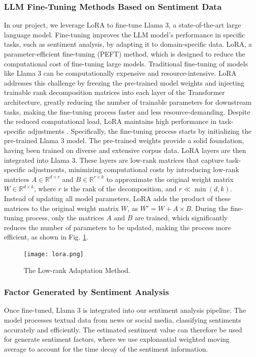 \documentclass[conference]{IEEEtran}
\begin{document}
\subsubsection{\textbf{LLM Fine-Tuning Methods Based on Sentiment Data}}
In our project, we leverage LoRA to fine-tune Llama 3, a state-of-the-art large language model.
Fine-tuning improves the LLM model's performance in specific tasks, such as sentiment analysis, by adapting it to domain-specific data.
LoRA, a parameter-efficient fine-tuning (PEFT) method, which is designed to reduce the computational cost of fine-tuning large models.
Traditional fine-tuning of models like Llama 3 can be computationally expensive and resource-intensive. 
LoRA addresses this challenge by freezing the pre-trained model weights and injecting trainable rank decomposition matrices into each layer of the Transformer architecture, greatly reducing the number of trainable parameters for downstream tasks, making the fine-tuning process faster and less resource-demanding.
Despite the reduced computational load, LoRA maintains high performance in task-specific adjustments \cite{hu2021}.
Specifically, the fine-tuning process starts by initializing the pre-trained Llama 3 model. 
The pre-trained weights provide a solid foundation, having been trained on diverse and extensive corpus data. 
LoRA layers are then integrated into Llama 3. 
These layers are low-rank matrices that capture task-specific adjustments, minimizing computational costs by introducing low-rank matrices \( A \in \mathbb{R}^{d \times r} \) and \( B \in \mathbb{R}^{r \times k} \) to approximate the original weight matrix \( W \in \mathbb{R}^{d \times k} \), where \( r \) is the rank of the decomposition, and \( r \ll \min(d, k) \).
Instead of updating all model parameters, LoRA adds the product of these matrices to the original weight matrix \( W \), as \( W' = W + A \times B \). 
During the fine-tuning process, only the matrices \(A\) and \(B\) are trained, which significantly reduces the number of parameters to be updated, making the process more efficient, as shown in Fig. \ref{fig:lora}.

\begin{figure}[h]
    \centering
    \texttt{[image: lora.png]}
    \caption{The Low-rank Adaptation Method.}
    \label{fig:lora}
\end{figure}

\subsubsection{\textbf{Factor Generated by Sentiment Analysis}}
Once fine-tuned, Llama 3 is integrated into our sentiment analysis pipeline. 
The model processes textual data from news or social media, classifying sentiments accurately and efficiently. 
The estimated sentiment value can therefore be used for generate sentiment factors, where we use explonantial weighted moving average to account for the time decay of the sentiment information.
\end{document}
